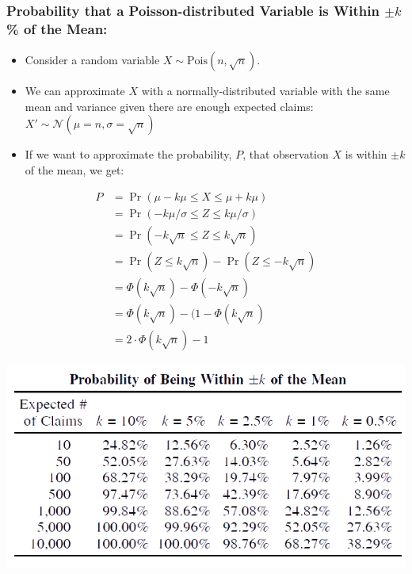 \documentclass[
]{article}
\begin{document}
\begin{yellow}

\hypertarget{probability-that-a-poisson-distributed-variable-is-within-pm-k-of-the-mean}{%
\subsubsection{\texorpdfstring{Probability that a Poisson-distributed
Variable is Within \(\pm k\)\% of the
Mean:}{Probability that a Poisson-distributed Variable is Within \textbackslash pm k\% of the Mean:}}\label{probability-that-a-poisson-distributed-variable-is-within-pm-k-of-the-mean}}

\begin{itemize}
\item
  Consider a random variable \(X\sim \text{Pois}(n, \sqrt{n})\).
\item
  We can approximate \(X\) with a normally-distributed variable with the
  same mean and variance given there are enough expected claims:
  \(X' \sim \mathcal{N}(\mu = n, \sigma = \sqrt{n})\)
\item
  If we want to approximate the probability, \(P\), that observation
  \(X\) is within \(\pm k\) of the mean, we get:
\end{itemize}

\[
  \begin{align}
    P &= \Pr(\mu - k \mu\leq X \leq \mu + k \mu) \\
      &= \Pr(-k\mu/\sigma \leq Z \le k\mu/\sigma) \\
      &= \Pr(-k\sqrt{n} \le Z \le k\sqrt{n}) \\
      &= \Pr(Z \le k\sqrt{n}) - \Pr(Z \le -k\sqrt{n}) \\
      &= \Phi(k\sqrt{n}) - \Phi(-k\sqrt{n}) \\
      &= \Phi(k\sqrt{n}) - (1 - \Phi(k\sqrt{n})  \\
      &= 2\cdot \Phi(k\sqrt{n}) - 1
  \end{align}
\]

\includegraphics{Figures/1+.png}

\end{yellow}
\end{document}
